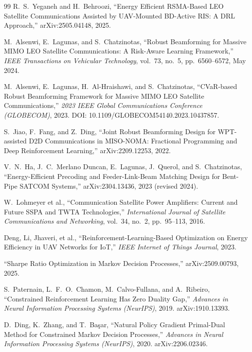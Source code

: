 \documentclass[11pt]{article}
\begin{document}
\begin{thebibliography}{99}
R.~S.~Yeganeh and H.~Behroozi, ``Energy Efficient RSMA-Based LEO Satellite
Communications Assisted by UAV-Mounted BD-Active RIS: A DRL Approach,''
arXiv:2505.04148, 2025.

M.~Alsenwi, E.~Lagunas, and S.~Chatzinotas, ``Robust Beamforming for
Massive MIMO LEO Satellite Communications: A Risk-Aware Learning
Framework,'' \emph{IEEE Transactions on Vehicular Technology}, vol.~73,
no.~5, pp.~6560--6572, May 2024.

M.~Alsenwi, E.~Lagunas, H.~Al-Hraishawi, and S.~Chatzinotas, ``CVaR-based
Robust Beamforming Framework for Massive MIMO LEO Satellite
Communications,'' \emph{2023 IEEE Global Communications Conference
(GLOBECOM)}, 2023. DOI: 10.1109/GLOBECOM54140.2023.10437857.

S.~Jiao, F.~Fang, and Z.~Ding, ``Joint Robust Beamforming Design for
WPT-assisted D2D Communications in MISO-NOMA: Fractional Programming and
Deep Reinforcement Learning,'' arXiv:2209.12253, 2022.

V.~N.~Ha, J.~C.~Merlano Duncan, E.~Lagunas, J.~Querol, and S.~Chatzinotas,
``Energy-Efficient Precoding and Feeder-Link-Beam Matching Design for
Bent-Pipe SATCOM Systems,'' arXiv:2304.13436, 2023 (revised 2024).

W.~Lohmeyer et al., ``Communication Satellite Power Amplifiers: Current and
Future SSPA and TWTA Technologies,'' \emph{International Journal of
Satellite Communications and Networking}, vol.~34, no.~2, pp.~95--113, 2016.

Deng, Li, Jhaveri, et al., ``Reinforcement-Learning-Based Optimization on
Energy Efficiency in UAV Networks for IoT,'' \emph{IEEE Internet of Things
Journal}, 2023.

``Sharpe Ratio Optimization in Markov Decision Processes,'' arXiv:2509.00793,
2025.

S.~Paternain, L.~F.~O.~Chamon, M.~Calvo-Fullana, and A.~Ribeiro,
``Constrained Reinforcement Learning Has Zero Duality Gap,'' \emph{Advances
in Neural Information Processing Systems (NeurIPS)}, 2019. arXiv:1910.13393.

D.~Ding, K.~Zhang, and T.~Ba\c{s}ar, ``Natural Policy Gradient Primal-Dual
Method for Constrained Markov Decision Processes,'' \emph{Advances in Neural
Information Processing Systems (NeurIPS)}, 2020. arXiv:2206.02346.


\end{thebibliography}
\end{document}
